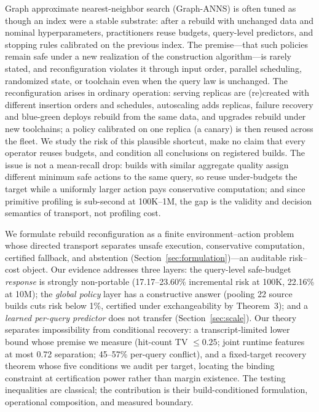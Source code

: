 \documentclass{article}
\begin{document}
Graph approximate nearest-neighbor search (Graph-ANNS) is often tuned as though an index were a stable
substrate: after a rebuild with unchanged data and nominal hyperparameters, practitioners reuse budgets,
query-level predictors, and stopping rules calibrated on the previous index. The premise---that such
policies remain safe under a new realization of the construction algorithm---is rarely stated, and
reconfiguration violates it through input order, parallel scheduling, randomized state, or toolchain even
when the query law is unchanged. The reconfiguration arises in ordinary operation: serving replicas are
(re)created with different insertion orders and schedules, autoscaling adds replicas, failure recovery and
blue-green deploys rebuild from the same data, and upgrades rebuild under new toolchains; a policy
calibrated on one replica (a canary) is then reused across the fleet. We study the risk of this plausible
shortcut, make no claim that every operator reuses budgets, and condition all conclusions on registered
builds. The issue is not a mean-recall drop: builds with similar aggregate quality assign different
minimum safe actions to the same query, so reuse under-budgets the target while a uniformly larger action
pays conservative computation; and since primitive profiling is sub-second at 100K--1M, the gap is the
validity and decision semantics of transport, not profiling cost.

We formulate rebuild reconfiguration as a finite environment--action problem whose directed transport
separates unsafe execution, conservative computation, certified fallback, and abstention
(Section~\ref{sec:formulation})---an auditable risk--cost object. Our evidence addresses three layers: the
query-level safe-budget \emph{response} is strongly non-portable (17.17--23.60\% incremental risk at
100K, 22.16\% at 10M); the \emph{global policy} layer has a constructive answer (pooling 22 source builds
cuts risk below 1\%, certified under exchangeability by Theorem~3); and a \emph{learned per-query
predictor} does not transfer (Section~\ref{sec:scale}). Our theory separates impossibility from
conditional recovery: a transcript-limited lower bound whose premise we measure (hit-count TV $\le0.25$;
joint runtime features at most 0.72 separation; 45--57\% per-query conflict), and a fixed-target recovery
theorem whose five conditions we audit per target, locating the binding constraint at certification power
rather than margin existence. The testing inequalities are classical; the contribution is their
build-conditioned formulation, operational composition, and measured boundary.
\end{document}
